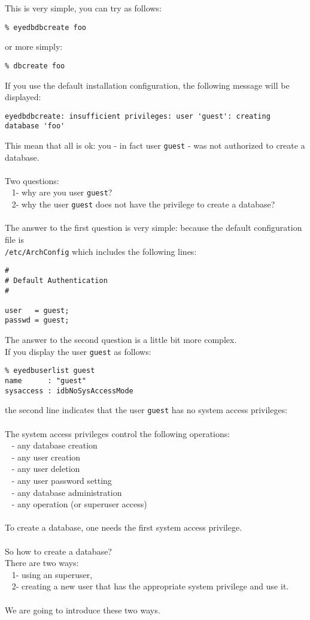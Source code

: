 This is very simple, you can try as follows:
\verbsize
\begin{verbatim}
% eyedbdbcreate foo
\end{verbatim}
or more simply:
\begin{verbatim}
% dbcreate foo
\end{verbatim}
\normalsize
If you use the default installation configuration, the following message
will be displayed:
\verbsize \begin{verbatim}
eyedbdbcreate: insufficient privileges: user 'guest': creating database 'foo'
\end{verbatim}
\normalsize
This mean that all is ok: you - in fact user \texttt{guest} - was not
authorized to create a database.
\\
\\
Two questions: \\
\mbox{ } 1- why are you user \texttt{guest}? \\
\mbox{ } 2- why the user \texttt{guest} does not have the privilege to create a database? \\
\\
The answer to the first question is very simple: because the default
configuration file is\\{\EYEDBARCH}\texttt{/etc/ArchConfig}
which includes the following lines:
\verbsize \begin{verbatim}
#
# Default Authentication
#
 
user   = guest;
passwd = guest;
\end{verbatim}
\normalsize
The answer to the second question is a little bit more complex.
\\
If you display the user \texttt{guest} as follows:
\verbsize \begin{verbatim}
% eyedbuserlist guest
name      : "guest"
sysaccess : idbNoSysAccessMode
\end{verbatim}
\normalsize
the second line indicates that the user \texttt{guest} has no system access
privileges:
\\
\\
The system access privileges control the following operations: \\
\mbox{ } - any database creation \\
\mbox{ } - any user creation \\
\mbox{ } - any user deletion \\
\mbox{ } - any user password setting \\
\mbox{ } - any database administration \\
\mbox{ } - any operation (or superuser access) \\
\\
To create a database, one needs the first system access privilege.
\\
\\
So how to create a database?\\
There are two ways:\\
\mbox{ } 1- using an \eyedb superuser, \\
\mbox{ } 2- creating a new user that has the appropriate system privilege
and use it.
\\
\\
We are going to introduce these two ways.


